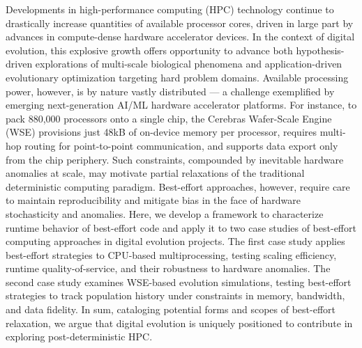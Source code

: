 {%
Developments in high-performance computing (HPC) technology continue to drastically increase quantities of available processor cores, driven in large part by advances in compute-dense hardware accelerator devices.
In the context of digital evolution, this explosive growth offers opportunity to advance both hypothesis-driven explorations of multi-scale biological phenomena and application-driven evolutionary optimization targeting hard problem domains.
Available processing power, however, is by nature vastly distributed --- a challenge exemplified by emerging next-generation AI/ML hardware accelerator platforms.
For instance, to pack 880,000 processors onto a single chip, the Cerebras Wafer-Scale Engine (WSE) provisions just 48kB of on-device memory per processor, requires multi-hop routing for point-to-point communication, and supports data export only from the chip periphery.
Such constraints, compounded by inevitable hardware anomalies at scale, may motivate partial relaxations of the traditional deterministic computing paradigm.
Best-effort approaches, however, require care to maintain reproducibility and mitigate bias in the face of hardware stochasticity and anomalies.
Here, we develop a framework to characterize runtime behavior of best-effort code and apply it to two case studies of best-effort computing approaches in digital evolution projects.
The first case study applies best-effort strategies to CPU-based multiprocessing, testing scaling efficiency, runtime quality-of-service, and their robustness to hardware anomalies.
The second case study examines WSE-based evolution simulations, testing best-effort strategies to track population history under constraints in memory, bandwidth, and data fidelity.
In sum, cataloging potential forms and scopes of best-effort relaxation, we argue that digital evolution is uniquely positioned to contribute in exploring post-deterministic HPC.
}
